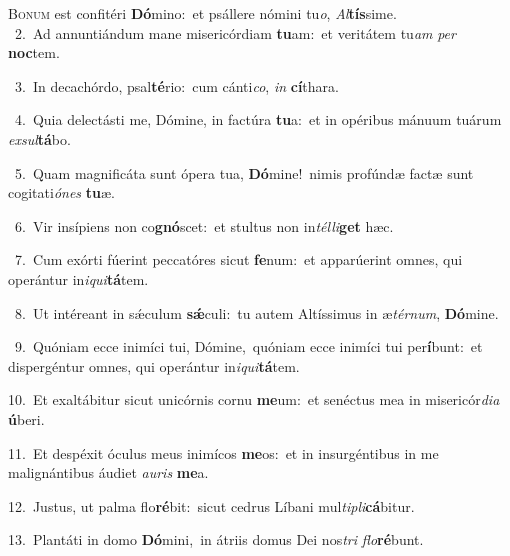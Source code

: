 \lettrine{\initial\textcolor{\initialcolor}{B}}{onum} est confitéri \textbf{Dó}\-mino:~\star et psállere nómini tu\-\textit{o}\-, \textit{Al}\-\textbf{tís}sime.\\
{\numbfont\textcolor{\numbcolor}{~2.}}~Ad annuntiándum mane misericórdiam \textbf{tu}\-am:~\star et veritátem tu\textit{am} \textit{per} \textbf{noc}\-tem.\par
{\numbfont\textcolor{\numbcolor}{~3.}}~In decachórdo, psal\-\textbf{té}\-rio:~\star cum cánti\-\textit{co}\-, \textit{in} \textbf{cí}\-thara.\par
{\numbfont\textcolor{\numbcolor}{~4.}}~Quia delectásti me, Dómine, in factúra \textbf{tu}\-a:~\star et in opéribus mánuum tuárum \textit{ex}\-\textit{sul}\textbf{tá}bo.\par
{\numbfont\textcolor{\numbcolor}{~5.}}~Quam magnificáta sunt ópera tua, \textbf{Dó}\-mine!~\star nimis profúndæ factæ sunt cogitati\-\textit{ó}\-\textit{nes} \textbf{tu}\-æ.\par
{\numbfont\textcolor{\numbcolor}{~6.}}~Vir insípiens non co\-\textbf{gnó}\-scet:~\star et stultus non in\-\textit{tél}\-\textit{li}\textbf{get} hæc.\par
{\numbfont\textcolor{\numbcolor}{~7.}}~Cum exórti fúerint peccatóres sicut \textbf{fe}\-num:~\star et apparúerint omnes, qui operántur in\-\textit{i}\-\textit{qui}\textbf{tá}tem.\par
{\numbfont\textcolor{\numbcolor}{~8.}}~Ut intéreant in sǽculum \textbf{sǽ}\-culi:~\star tu autem Altíssimus in æ\-\textit{tér}\-\textit{num}, \textbf{Dó}\-mine.\par
{\numbfont\textcolor{\numbcolor}{~9.}}~Quóniam ecce inimíci tui, Dómine,~\dagger quóniam ecce inimíci tui per\-\textbf{í}\-bunt:~\star et dispergéntur omnes, qui operántur in\-\textit{i}\-\textit{qui}\textbf{tá}tem.\par
{\numbfont\textcolor{\numbcolor}{10.}}~Et exaltábitur sicut unicórnis cornu \textbf{me}\-um:~\star et senéctus mea in misericór\-\textit{di}\-\textit{a} \textbf{ú}\-beri.\par
{\numbfont\textcolor{\numbcolor}{11.}}~Et despéxit óculus meus inimícos \textbf{me}\-os:~\star et in insurgéntibus in me malignántibus áudiet \textit{au}\-\textit{ris} \textbf{me}\-a.\par
{\numbfont\textcolor{\numbcolor}{12.}}~Justus, ut palma flo\-\textbf{ré}\-bit:~\star sicut cedrus Líbani mul\-\textit{ti}\-\textit{pli}\textbf{cá}bitur.\par
{\numbfont\textcolor{\numbcolor}{13.}}~Plantáti in domo \textbf{Dó}\-mini,~\star in átriis domus Dei nos\textit{tri} \textit{flo}\-\textbf{ré}bunt.\par
